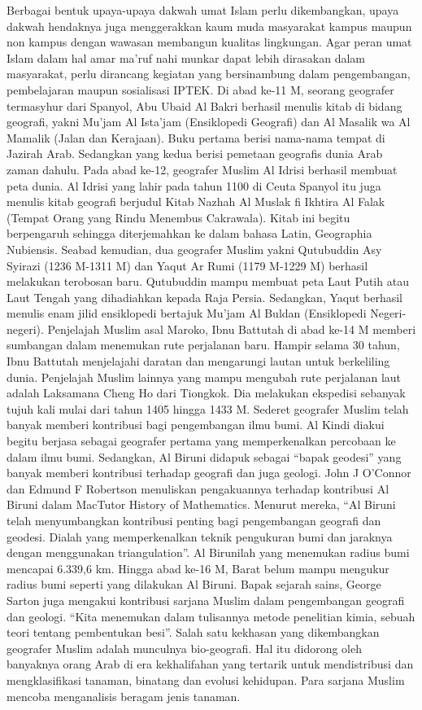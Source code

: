 	Berbagai bentuk upaya-upaya dakwah umat Islam perlu dikembangkan, upaya dakwah hendaknya juga menggerakkan kaum muda masyarakat kampus maupun non kampus dengan wawasan membangun kualitas lingkungan. Agar peran umat Islam dalam hal amar ma’ruf nahi munkar dapat lebih dirasakan dalam masyarakat, perlu dirancang kegiatan yang bersinambung dalam pengembangan, pembelajaran maupun sosialisasi IPTEK. 
	Di abad ke-11 M, seorang geografer termasyhur dari Spanyol, Abu Ubaid Al Bakri berhasil menulis kitab di bidang geografi, yakni Mu’jam Al Ista’jam (Ensiklopedi Geografi) dan Al Masalik wa Al Mamalik (Jalan dan Kerajaan). Buku pertama berisi nama-nama tempat di Jazirah Arab. Sedangkan yang kedua berisi pemetaan geografis dunia Arab zaman dahulu.
	Pada abad ke-12, geografer Muslim Al Idrisi berhasil membuat peta dunia. Al Idrisi yang lahir pada tahun 1100 di Ceuta Spanyol itu juga menulis kitab geografi berjudul Kitab Nazhah Al Muslak fi Ikhtira Al Falak (Tempat Orang yang Rindu Menembus Cakrawala). Kitab ini begitu berpengaruh sehingga diterjemahkan ke dalam bahasa Latin, Geographia Nubiensis.
	Seabad kemudian, dua geografer Muslim yakni Qutubuddin Asy Syirazi (1236 M-1311 M) dan Yaqut Ar Rumi (1179 M-1229 M) berhasil melakukan terobosan baru. Qutubuddin mampu membuat peta Laut Putih atau Laut Tengah yang dihadiahkan kepada Raja Persia. Sedangkan, Yaqut berhasil menulis enam jilid ensiklopedi bertajuk Mu’jam Al Buldan (Ensiklopedi Negeri-negeri).
	Penjelajah Muslim asal Maroko, Ibnu Battutah di abad ke-14 M memberi sumbangan dalam menemukan rute perjalanan baru. Hampir selama 30 tahun, Ibnu Battutah menjelajahi daratan dan mengarungi lautan untuk berkeliling dunia. Penjelajah Muslim lainnya yang mampu mengubah rute perjalanan laut adalah Laksamana Cheng Ho dari Tiongkok. Dia melakukan ekspedisi sebanyak tujuh kali mulai dari tahun 1405 hingga 1433 M.
	Sederet geografer Muslim telah banyak memberi kontribusi bagi pengembangan ilmu bumi. Al Kindi diakui begitu berjasa sebagai geografer pertama yang memperkenalkan percobaan ke dalam ilmu bumi. Sedangkan, Al Biruni didapuk sebagai “bapak geodesi” yang banyak memberi kontribusi terhadap geografi dan juga geologi.
	John J O’Connor dan Edmund F Robertson menuliskan pengakuannya terhadap kontribusi Al Biruni dalam MacTutor History of Mathematics. Menurut mereka, “Al Biruni telah menyumbangkan kontribusi penting bagi pengembangan geografi dan geodesi. Dialah yang memperkenalkan teknik pengukuran bumi dan jaraknya dengan menggunakan triangulation”.
	Al Birunilah yang menemukan radius bumi mencapai 6.339,6 km. Hingga abad ke-16 M, Barat belum mampu mengukur radius bumi seperti yang dilakukan Al Biruni. Bapak sejarah sains, George Sarton juga mengakui kontribusi sarjana Muslim dalam pengembangan geografi dan geologi. “Kita menemukan dalam tulisannya metode penelitian kimia, sebuah teori tentang pembentukan besi”.
	Salah satu kekhasan yang dikembangkan geografer Muslim adalah munculnya bio-geografi. Hal itu didorong oleh banyaknya orang Arab di era kekhalifahan yang tertarik untuk mendistribusi dan mengklasifikasi tanaman, binatang dan evolusi kehidupan. Para sarjana Muslim mencoba menganalisis beragam jenis tanaman.



